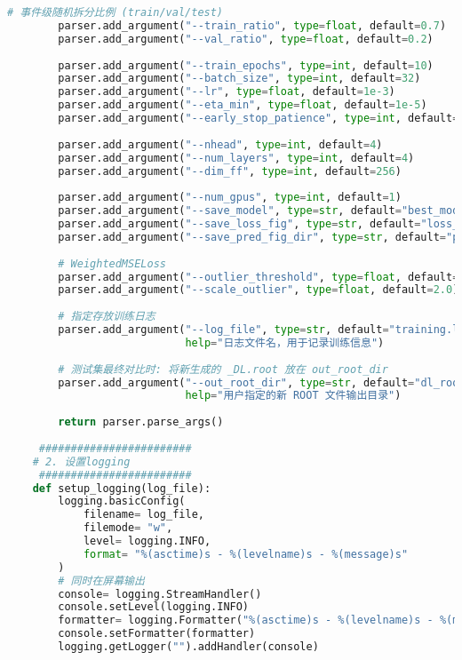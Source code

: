 \begin{lstlisting}[language=Python, caption={模型训练、验证与测试对比脚本 (train\_val\_test\_compare\_v1.py)}, label={lst:train_script}]
        # 事件级随机拆分比例 (train/val/test)
        parser.add_argument("--train_ratio", type=float, default=0.7)
        parser.add_argument("--val_ratio", type=float, default=0.2)
    
        parser.add_argument("--train_epochs", type=int, default=10)
        parser.add_argument("--batch_size", type=int, default=32)
        parser.add_argument("--lr", type=float, default=1e-3)
        parser.add_argument("--eta_min", type=float, default=1e-5)
        parser.add_argument("--early_stop_patience", type=int, default=5)
    
        parser.add_argument("--nhead", type=int, default=4)
        parser.add_argument("--num_layers", type=int, default=4)
        parser.add_argument("--dim_ff", type=int, default=256)
    
        parser.add_argument("--num_gpus", type=int, default=1)
        parser.add_argument("--save_model", type=str, default="best_model.pth")
        parser.add_argument("--save_loss_fig", type=str, default="loss_curve.png")
        parser.add_argument("--save_pred_fig_dir", type=str, default="pred_figs")
    
        # WeightedMSELoss
        parser.add_argument("--outlier_threshold", type=float, default=10.0)
        parser.add_argument("--scale_outlier", type=float, default=2.0)
    
        # 指定存放训练日志
        parser.add_argument("--log_file", type=str, default="training.log",
                            help="日志文件名，用于记录训练信息")
    
        # 测试集最终对比时: 将新生成的 _DL.root 放在 out_root_dir
        parser.add_argument("--out_root_dir", type=str, default="dl_root_files",
                            help="用户指定的新 ROOT 文件输出目录")
    
        return parser.parse_args()
    
     ########################
    # 2. 设置logging
     ########################
    def setup_logging(log_file):
        logging.basicConfig(
            filename= log_file,
            filemode= "w",
            level= logging.INFO,
            format= "%(asctime)s - %(levelname)s - %(message)s"
        )
        # 同时在屏幕输出
        console= logging.StreamHandler()
        console.setLevel(logging.INFO)
        formatter= logging.Formatter("%(asctime)s - %(levelname)s - %(message)s")
        console.setFormatter(formatter)
        logging.getLogger("").addHandler(console)
    

\end{lstlisting}
